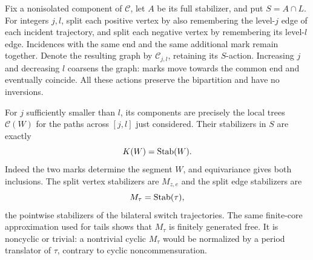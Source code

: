 Fix a nonisolated component of $\mathcal C$, let $A$ be its full stabilizer,
and put $S=A\cap L$.  For integers $j,l$, split each positive vertex by
also remembering the level-$j$ edge of each incident trajectory, and split
each negative vertex by remembering its level-$l$ edge.  Incidences with
the same end and the same additional mark remain together.  Denote the
resulting graph by $\mathcal C_{j,l}$, retaining its $S$-action.  Increasing
$j$ and decreasing $l$ coarsens the graph: marks move towards the common
end and eventually coincide.  All these actions preserve the bipartition
and have no inversions.

For $j$ sufficiently smaller than $l$, its components are precisely the
local trees $\mathcal C(W)$ for the paths across $[j,l]$ just considered.
Their stabilizers in $S$ are exactly
\[
 K(W)=\operatorname{Stab}(W).
\]
Indeed the two marks determine the segment $W$, and equivariance gives
both inclusions.  The split vertex stabilizers are $M_{z,e}$ and the split
edge stabilizers are
\[
 M_\tau=\operatorname{Stab}(\tau),
\]
the pointwise stabilizers of the bilateral switch trajectories.  The same
finite-core approximation used for tails shows that $M_\tau$ is finitely
generated free.  It is noncyclic or trivial: a nontrivial cyclic $M_\tau$
would be normalized by a period translator of $\tau$, contrary to cyclic
noncommensuration.

